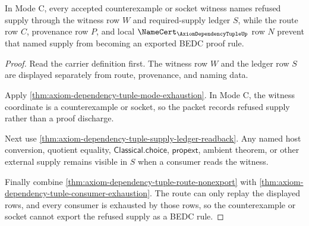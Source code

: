 \begin{theorem}
\label{thm:axiom-dependency-tuple-counterexample-socket-nonexport}
In Mode C, every accepted counterexample or socket witness names refused supply
through the witness row $W$ and required-supply ledger $S$, while the route row
$C$, provenance row $P$, and local $\NameCert_{\AxiomDependencyTupleUp}$ row $N$
prevent that named supply from becoming an exported BEDC proof rule.
\end{theorem}
\begin{proof}
Read the carrier definition first. The witness row $W$ and the ledger row $S$
are displayed separately from route, provenance, and naming data.

Apply \autoref{thm:axiom-dependency-tuple-mode-exhaustion}. In Mode C, the
witness coordinate is a counterexample or socket, so the packet records refused
supply rather than a proof discharge.

Next use \autoref{thm:axiom-dependency-tuple-supply-ledger-readback}. Any named
host conversion, quotient equality, $\mathsf{Classical.choice}$,
$\mathsf{propext}$, ambient theorem, or other external supply remains visible in
$S$ when a consumer reads the witness.

Finally combine \autoref{thm:axiom-dependency-tuple-route-nonexport} with
\autoref{thm:axiom-dependency-tuple-consumer-exhaustion}. The route can only
replay the displayed rows, and every consumer is exhausted by those rows, so the
counterexample or socket cannot export the refused supply as a BEDC rule.
\end{proof}

